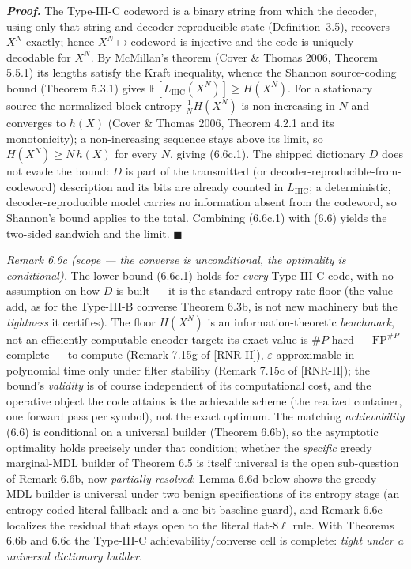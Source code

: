 \documentclass[
]{article}
\begin{document}
\emph{\textbf{Proof.}} The Type-III-C codeword is a binary string from
which the decoder, using only that string and decoder-reproducible
state (Definition~3.5), recovers $X^N$ exactly; hence $X^N \mapsto
\text{codeword}$ is injective and the code is uniquely decodable for
$X^N$. By McMillan's theorem (Cover \& Thomas 2006, Theorem 5.5.1) its
lengths satisfy the Kraft inequality, whence the Shannon source-coding
bound (Theorem 5.3.1) gives $\mathbb{E}[L_{\mathrm{IIIC}}(X^N)] \ge
H(X^N)$. For a stationary source the normalized block entropy
$\tfrac{1}{N}H(X^N)$ is non-increasing in $N$ and converges to $h(X)$
(Cover \& Thomas 2006, Theorem 4.2.1 and its monotonicity); a
non-increasing sequence stays above its limit, so $H(X^N) \ge N\,h(X)$
for every $N$, giving (6.6c.1). The shipped dictionary $D$ does not
evade the bound: $D$ is part of the transmitted (or
decoder-reproducible-from-codeword) description and its bits are
already counted in $L_{\mathrm{IIIC}}$; a deterministic,
decoder-reproducible model carries no information absent from the
codeword, so Shannon's bound applies to the total. Combining (6.6c.1)
with (6.6) yields the two-sided sandwich and the limit. \hfill$\blacksquare$

\emph{Remark 6.6c (scope --- the converse is unconditional, the
optimality is conditional).} The lower bound (6.6c.1) holds for
\emph{every} Type-III-C code, with no assumption on how $D$ is built ---
it is the standard entropy-rate floor (the value-add, as for the
Type-III-B converse Theorem 6.3b, is not new machinery but the
\emph{tightness} it certifies). The floor $H(X^N)$ is an
information-theoretic \emph{benchmark}, not an efficiently computable
encoder target: its exact value is $\#P$-hard --- $\mathrm{FP}^{\#P}$-complete
--- to compute (Remark 7.15g of [RNR-II]), $\varepsilon$-approximable in polynomial time
only under filter stability (Remark 7.15c of [RNR-II]); the bound's \emph{validity} is
of course independent of its computational cost, and the operative object the
code attains is the achievable scheme (the realized container, one forward
pass per symbol), not the exact optimum. The matching \emph{achievability}
(6.6) is conditional on a universal builder (Theorem 6.6b), so the
asymptotic optimality holds precisely under that condition; whether the
\emph{specific} greedy marginal-MDL builder of Theorem 6.5 is itself
universal is the open sub-question of Remark 6.6b, now \emph{partially
resolved}: Lemma 6.6d below shows the greedy-MDL builder is universal
under two benign specifications of its entropy stage (an entropy-coded
literal fallback and a one-bit baseline guard), and Remark 6.6e
localizes the residual that stays open to the literal flat-$8\ell$ rule.
With Theorems 6.6b and 6.6c the
Type-III-C achievability/converse cell is complete: \emph{tight under a
universal dictionary builder}.
\end{document}
